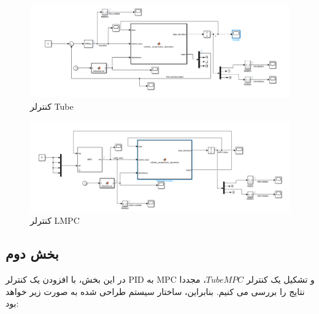 \begin{figure}[H]
	\centering
	\includegraphics[width=1\linewidth]{../img/17}
	\caption{کنترلر Tube}
	\label{fig:17}
\end{figure}

\begin{figure}[H]
	\centering
	\includegraphics[width=1\linewidth]{../img/18}
	\caption{کنترلر LMPC}
	\label{fig:18}
\end{figure}

\subsection*{بخش دوم}
در این بخش، با افزودن یک کنترلر PID به MPC و تشکیل یک کنترلر $Tube MPC$، مجددا نتایج را بررسی می کنیم. بنابراین، ساختار سیستم طراحی شده به صورت زیر خواهد بود:

